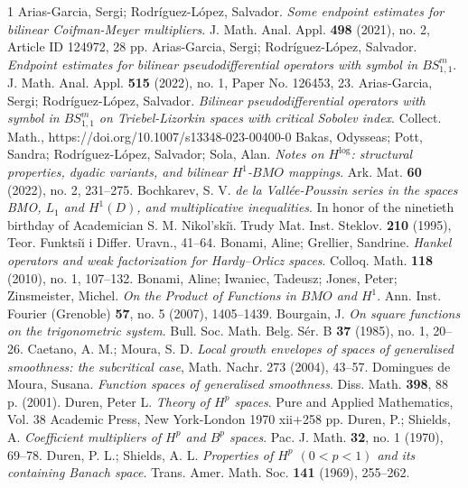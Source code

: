 \documentclass[a4paper, leqno, 10pt]{amsart}
\numberwithin{equation}{section}
\begin{document}
\begin{thebibliography}{1}
%
 Arias-Garcia, Sergi; Rodr\'{i}guez-L\'{o}pez, Salvador. {\it Some endpoint estimates for bilinear Coifman-Meyer multipliers}. J. Math. Anal. Appl. {\bf 498} (2021), no. 2, Article ID 124972, 28 pp.
%
Arias-Garcia, Sergi; Rodr\'iguez-L\'opez, Salvador. {\it  Endpoint estimates for bilinear pseudodifferential operators with symbol in $BS^m_{1,1}$}. J. Math. Anal. Appl. {\bf 515} (2022),
no. 1, Paper No. 126453, 23.
%
 Arias-Garcia, Sergi; Rodr\'{i}guez-L\'{o}pez, Salvador. {\it  Bilinear pseudodifferential operators with symbol in $BS^m_{1,1}$ on Triebel-Lizorkin spaces with critical Sobolev index}. Collect. Math., https://doi.org/10.1007/s13348-023-00400-0
%
 Bakas, Odysseas; Pott, Sandra; Rodr\'{i}guez-L\'{o}pez, Salvador; Sola, Alan. {\it Notes on $H^{\log} $: structural properties, dyadic variants, and bilinear $H^1$-$BMO$ mappings}.  Ark. Mat. {\bf 60} (2022), no. 2, 231--275. 
%
 Bochkarev, S. V. {\it de la Vall\'ee-Poussin series in the spaces BMO, $L_1$ and $H^1(D)$, and multiplicative inequalities}. In honor of the ninetieth birthday of Academician S. M. Nikol'ski\u{\i}. 
Trudy Mat. Inst. Steklov. {\bf 210} (1995), Teor. Funktsi\u{\i} i Differ. Uravn., 41--64. 
%
 Bonami, Aline; Grellier, Sandrine. {\it Hankel operators and weak factorization for Hardy--Orlicz spaces}. Colloq. Math. {\bf 118} (2010), no. 1, 107--132.
%
 Bonami, Aline; Iwaniec, Tadeusz;  Jones, Peter;  Zinsmeister, Michel. {\it On the Product of Functions in $BMO$ and $H^1$}. Ann. Inst. Fourier (Grenoble) {\bf 57}, no. 5 (2007), 1405--1439.
%
 Bourgain, J. {\it On square functions on the trigonometric system}.
Bull. Soc. Math. Belg. S\'er. B {\bf 37} (1985), no. 1, 20--26. 
%
 Caetano, A. M.;  Moura, S. D. {\it Local growth envelopes of spaces of generalised smoothness: the subcritical case}, Math. Nachr. 273 (2004), 43–57.
%
 Domingues de Moura, Susana. {\it Function spaces of generalised smoothness}. Diss. Math. {\bf 398}, 88 p. (2001).
%
 Duren, Peter L. {\it Theory of $H^p$ spaces}. Pure and Applied Mathematics, Vol. 38 Academic Press, New York-London 1970 xii+258 pp.
%
 Duren, P.; Shields, A. {\it Coefficient multipliers of $H^p$ and $B^p$ spaces}. Pac. J. Math. {\bf 32}, no. 1 (1970), 69--78.
%
 Duren, P. L.; Shields, A. L. {\it Properties of $H^p$ $(0<p<1)$ and its containing Banach space}. Trans. Amer. Math. Soc. {\bf 141} (1969), 255--262.

\end{thebibliography}
\end{document}
